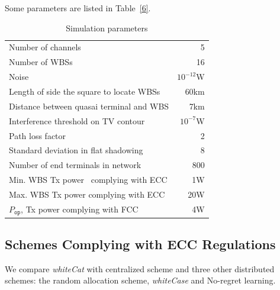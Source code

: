 \documentclass[times]{ettauth}
\theoremstyle{mytheoremstyle}
\theoremstyle{mytheoremstyle}
\theoremstyle{mytheoremstyle}
\begin{document}
Some parameters are listed in Table~\ref{6}.

\begin{table}[!h]
\centering
\begin{tabular}{|l|r|}
  \hline
  Number of channels 						& 5 \\
  Number of WBSs							& 16\\
  Noise 									& $10^{-12}$W \\ %
  Length of side the square to locate WBSs		& 60km\\
  Distance between quasai terminal and WBS 	& 7km \\
  Interference threshold on TV contour 		& $10^{-7}$W \\ %
  Path loss factor 							& 2 \\
  Standard deviation in flat shadowing		& 8\\
  Number of end terminals in network 		& 800 \\
  Min. WBS Tx power~\footnotemark{} complying with ECC 			& 1W \\
  Max. WBS Tx power complying with ECC			& 20W \\
  $P_{\mathtt{op}}$, Tx power complying with FCC   & 4W\\

  \hline
\end{tabular}
\caption{Simulation parameters}
\label{simulationparameter}
\end{table}

\subsection{Schemes Complying with ECC Regulations}
\label{MaxPower_whitecat}

We compare \textit{whiteCat} with centralized scheme and three other distributed schemes: the random allocation scheme, \textit{whiteCase} and No-regret learning.
\end{document}
